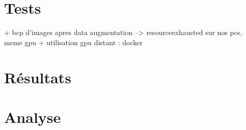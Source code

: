 \documentclass{report}
\begin{document}
\chapter{Tests}

+ bcp d'images apres data augmentation --> resourceexhausted sur nos pcs, meme gpu
+ utilisation gpu distant : docker


\chapter{Résultats}

\chapter{Analyse}
\end{document}
